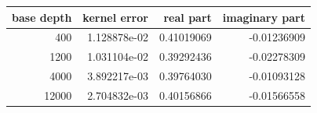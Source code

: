 \begin{center}
\begin{tabular}{rrrr}
\toprule base depth & kernel error & real part & imaginary part\\\midrule
400 & 1.128878e-02 & 0.41019069 & -0.01236909\\
1200 & 1.031104e-02 & 0.39292436 & -0.02278309\\
4000 & 3.892217e-03 & 0.39764030 & -0.01093128\\
12000 & 2.704832e-03 & 0.40156866 & -0.01566558\\
\bottomrule
\end{tabular}
\end{center}